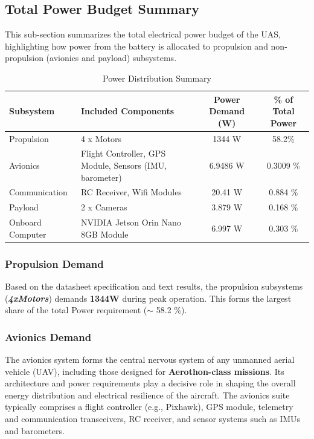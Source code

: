 \documentclass[12pt]{report}
\begin{document}
      \subsection{Total Power Budget Summary}
      This sub-section summarizes the total electrical power budget of the UAS, highlighting how power from the battery is allocated to propulsion and non-propulsion (avionics and payload) subsystems.
      \begin{table}[h!]
        \centering
        \caption{Power Distribution Summary}
        \begin{tabular}{|l|p{5.5cm}|c|c|}
          \hline
          \textbf{Subsystem} & \textbf{Included Components} & \textbf{Power Demand (W)} & \textbf{\% of Total Power} \\
          \hline
          Propulsion & {\small 4 x Motors} & 1344 W & 58.2\% \\
          Avionics & {\small Flight Controller, GPS Module, Sensors (IMU, barometer)} & 6.9486 W & 0.3009 \% \\
          Communication & {\small RC Receiver, Wifi Modules}  & 20.41 W & 0.884 \% \\
          Payload & {\small 2 x Cameras} & 3.879 W & 0.168 \% \\
          Onboard Computer  & {\small NVIDIA Jetson Orin Nano 8GB Module} & 6.997 W & 0.303 \% \\
          \hline
        \end{tabular}
      \end{table}

        \subsubsection{\large Propulsion Demand}
        Based on the datasheet specification and text results, the propulsion subsystems (\textbf{\textit{4xMotors}}) demands \textbf{1344W} during peak operation. This forms the largest share of the total Power requirement ($ \sim $ 58.2 \%).
        \subsubsection{Avionics Demand}
        The avionics system forms the central nervous system of any unmanned aerial vehicle (UAV), including those designed for \textbf{Aerothon-class missions}. Its architecture and power requirements play a decisive role in shaping the overall energy distribution and electrical resilience of the aircraft. The avionics suite typically comprises a flight controller (e.g., Pixhawk), GPS module, telemetry and communication transceivers, RC receiver, and sensor systems such as IMUs and barometers. \\ 
\end{document}
